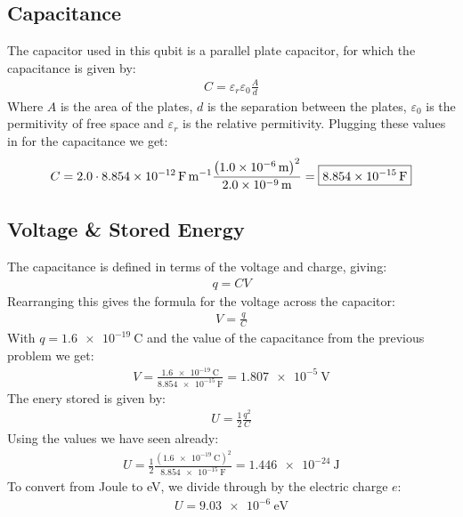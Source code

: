 \documentclass[12pt]{article}
\begin{document}
\subsection{Capacitance}
The capacitor used in this qubit is a parallel plate capacitor, for which the capacitance is given by:
\begin{align*}
  C=\varepsilon_r\varepsilon_0\frac{A}{d}
\end{align*}
Where $A$ is the area of the plates, $d$ is the separation between the plates, $\varepsilon_0$ is the permitivity of free space and $\varepsilon_r$ is the relative permitivity. Plugging these values in for the capacitance we get:
\begin{align*}
  C=2.0\cdot\SI{8.854e-12}{\farad\per\meter}
  \frac{\qty(\SI{1.0e-6}{\m})^2}{\SI{2.0e-9}{\m}}
  =\boxed{\SI{8.854e-15}{\F}}
\end{align*}
\subsection{Voltage \& Stored Energy}
The capacitance is defined in terms of the voltage and charge, giving:
\begin{align*}
  q=CV
\end{align*}
Rearranging this gives the formula for the voltage across the capacitor:
\begin{align*}
  V=\frac{q}{C}
\end{align*}
With $q=\SI{1.6e-19}{\coulomb}$ and the value of the capacitance from the previous problem we get:
\begin{align*}
  V=\frac{\SI{1.6e-19}{\coulomb}}{\SI{8.854e-15}{\F}}=\boxed{\SI{1.807e-5}{\V}}
\end{align*}
The enery stored is given by:
\begin{align*}
  U=\frac{1}{2}\frac{q^2}{C}
\end{align*}
Using the values we have seen already:
\begin{align*}
  U=\frac{1}{2}\frac{(\SI{1.6e-19}{\coulomb})^2}{\SI{8.854e-15}{\F}}
  =\SI{1.446e-24}{\J}
\end{align*}
To convert from Joule to eV, we divide through by the electric charge $e$:
\begin{align*}
  \boxed{U=\SI{9.03e-6}{\eV}}
\end{align*}
\end{document}
